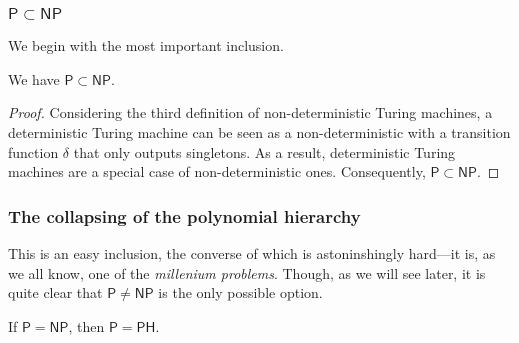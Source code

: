 \subsubsection{$ \mathsf{P} \subset \mathsf{NP} $}

We begin with the most important inclusion.

\begin{proposition}
    We have $ \mathsf P \subset \mathsf{NP} $.
\end{proposition}

\begin{proof}
    Considering the third definition of non-deterministic Turing machines, a deterministic Turing machine can be seen as a non-deterministic with a transition function $ \delta $ that only outputs singletons. As a result, deterministic Turing machines are a special case of non-deterministic ones. Consequently, $ \mathsf P \subset \mathsf{NP} $.
\end{proof}

\subsubsection{The collapsing of the polynomial hierarchy}

This is an easy inclusion, the converse of which is astoninshingly hard---it is, as we all know, one of the \textit{millenium problems}. Though, as we will see later, it is quite clear that $ \mathsf P \neq \mathsf{NP} $ is the only possible option.

\begin{proposition}
    If $ \mathsf P = \mathsf{NP} $, then $ \mathsf P = \mathsf{PH} $.
\end{proposition}

